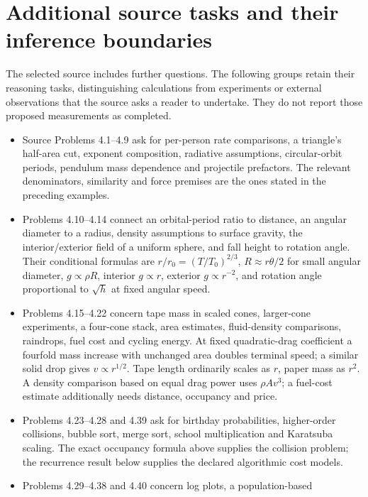 \section{Additional source tasks and their inference boundaries}
\label{sec:p15-dimensional-source-tasks}

The selected source includes further questions. The following groups retain
their reasoning tasks, distinguishing calculations from experiments or
external observations that the source asks a reader to undertake.
They do not report those proposed measurements as completed.

\begin{itemize}
\item Source Problems 4.1--4.9 ask for per-person rate comparisons,
a triangle's half-area cut, exponent composition, radiative assumptions,
circular-orbit periods, pendulum mass dependence and projectile prefactors.
The relevant denominators, similarity and force premises are the ones
stated in the preceding examples.
\item Problems 4.10--4.14 connect an orbital-period ratio to distance,
an angular diameter to a radius, density assumptions to surface gravity,
the interior/exterior field of a uniform sphere, and fall height to rotation
angle. Their conditional formulas are
\(r/r_0=(T/T_0)^{2/3}\), \(R\approx r\theta/2\) for small angular diameter,
\(g\propto\rho R\), interior \(g\propto r\), exterior \(g\propto r^{-2}\),
and rotation angle proportional to \(\sqrt h\) at fixed angular speed.
\item Problems 4.15--4.22 concern tape mass in scaled cones, larger-cone
experiments, a four-cone stack, area estimates, fluid-density comparisons,
raindrops, fuel cost and cycling energy.
At fixed quadratic-drag coefficient a fourfold mass increase with unchanged
area doubles terminal speed; a similar solid drop gives \(v\propto r^{1/2}\).
Tape length ordinarily scales as \(r\), paper mass as \(r^2\).
A density comparison based on equal drag power uses \(\rho A v^3\);
a fuel-cost estimate additionally needs distance, occupancy and price.
\item Problems 4.23--4.28 and 4.39 ask for birthday probabilities,
higher-order collisions, bubble sort, merge sort, school multiplication
and Karatsuba scaling. The exact occupancy formula above supplies the
collision problem; the recurrence result below supplies the declared
algorithmic cost models.
\item Problems 4.29--4.38 and 4.40 concern log plots, a population-based

\end{itemize}
